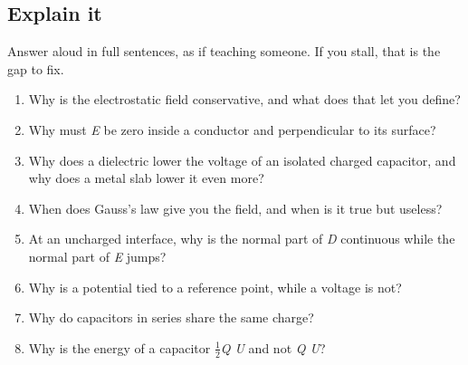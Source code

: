 \documentclass[11pt]{article}
\begin{document}
\begin{keepsection}
\section{Explain it}

Answer aloud in full sentences, as if teaching someone. If you stall, that is the gap to fix.

\begin{enumerate}
\item Why is the electrostatic field conservative, and what does that let you define?
\item Why must \textit{E} be zero inside a conductor and perpendicular to its surface?
\item Why does a dielectric lower the voltage of an isolated charged capacitor, and why does a metal slab lower it even more?
\item When does Gauss’s law give you the field, and when is it true but useless?
\item At an uncharged interface, why is the normal part of \textit{D} continuous while the normal part of \textit{E} jumps?
\item Why is a potential tied to a reference point, while a voltage is not?
\item Why do capacitors in series share the same charge?
\item Why is the energy of a capacitor \ensuremath{\tfrac12}\textit{Q U} and not \textit{Q U}?
\end{enumerate}

\end{keepsection}

\clearpage
\end{document}
